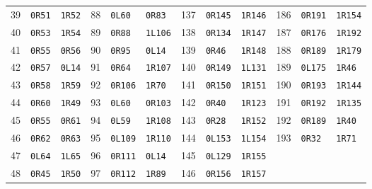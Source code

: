 \begin{center}
\begin{tabular}{@{}rll@{\hspace{1.6em}}rll@{\hspace{1.6em}}rll@{\hspace{1.6em}}rll@{}}
39 & \texttt{0R51} & \texttt{1R52} & 88 & \texttt{0L60} & \texttt{0R83} & 137 & \texttt{0R145} & \texttt{1R146} & 186 & \texttt{0R191} & \texttt{1R154}\\
40 & \texttt{0R53} & \texttt{1R54} & 89 & \texttt{0R88} & \texttt{1L106} & 138 & \texttt{0R134} & \texttt{1R147} & 187 & \texttt{0R176} & \texttt{1R192}\\
41 & \texttt{0R55} & \texttt{0R56} & 90 & \texttt{0R95} & \texttt{0L14} & 139 & \texttt{0R46} & \texttt{1R148} & 188 & \texttt{0R189} & \texttt{1R179}\\
42 & \texttt{0R57} & \texttt{0L14} & 91 & \texttt{0R64} & \texttt{1R107} & 140 & \texttt{0R149} & \texttt{1L131} & 189 & \texttt{0L175} & \texttt{1R46}\\
43 & \texttt{0R58} & \texttt{1R59} & 92 & \texttt{0R106} & \texttt{1R70} & 141 & \texttt{0R150} & \texttt{1R151} & 190 & \texttt{0R193} & \texttt{1R144}\\
44 & \texttt{0R60} & \texttt{1R49} & 93 & \texttt{0L60} & \texttt{0R103} & 142 & \texttt{0R40} & \texttt{1R123} & 191 & \texttt{0R192} & \texttt{1R135}\\
45 & \texttt{0R55} & \texttt{0R61} & 94 & \texttt{0L59} & \texttt{1R108} & 143 & \texttt{0R28} & \texttt{1R152} & 192 & \texttt{0R189} & \texttt{1R40}\\
46 & \texttt{0R62} & \texttt{0R63} & 95 & \texttt{0L109} & \texttt{1R110} & 144 & \texttt{0L153} & \texttt{1L154} & 193 & \texttt{0R32} & \texttt{1R71}\\
47 & \texttt{0L64} & \texttt{1L65} & 96 & \texttt{0R111} & \texttt{0L14} & 145 & \texttt{0L129} & \texttt{1R155} &  &  & \\
48 & \texttt{0R45} & \texttt{1R50} & 97 & \texttt{0R112} & \texttt{1R89} & 146 & \texttt{0R156} & \texttt{1R157} &  &  & \\
\bottomrule
\end{tabular}
\end{center}

